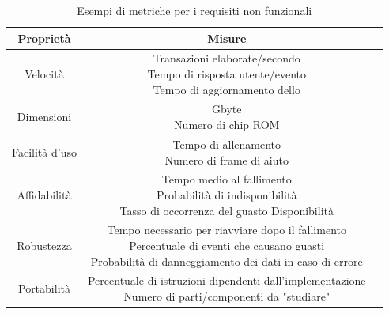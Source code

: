 \documentclass{article}
\begin{document}
	\begin{table}[h!]
		\centering
		\begin{tabular}{ |c|c|c| } 
			\hline
			\textbf{Proprietà} & \textbf{Misure}\\
			\hline
			Velocità & \makecell{Transazioni elaborate/secondo \\ Tempo di risposta utente/evento \\ Tempo di aggiornamento dello}\\
			\hline
			Dimensioni & \makecell{Gbyte \\ Numero di chip ROM}\\
			\hline
			Facilità d'uso & \makecell{Tempo di allenamento \\ Numero di frame di aiuto}\\
			\hline
			Affidabilità & \makecell{Tempo medio al fallimento \\ Probabilità di indisponibilità \\ Tasso di occorrenza del guasto Disponibilità}\\
			\hline
			Robustezza & \makecell{Tempo necessario per riavviare dopo il fallimento \\ Percentuale di eventi che causano guasti \\ Probabilità di danneggiamento dei dati in caso di errore}\\
			\hline
			Portabilità & \makecell{Percentuale di istruzioni dipendenti dall'implementazione \\ Numero di parti/componenti da "studiare"}\\
			\hline
		\end{tabular}
		\caption{Esempi di metriche per i requisiti non funzionali}
	\end{table}
\end{document}
